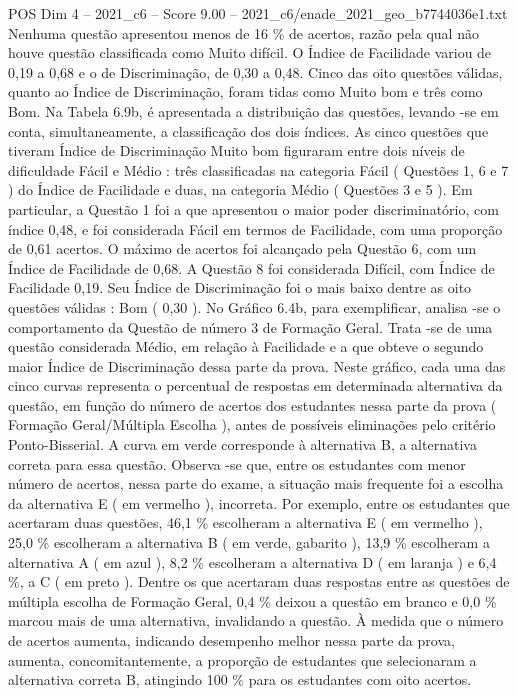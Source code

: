 \begin{textsample}{POS Dim 4 – 2021\_c6 – Score 9.00 – 2021\_c6/enade\_2021\_geo\_b7744036e1.txt}
Nenhuma questão apresentou menos de 16 \% de acertos, razão pela qual não houve questão classificada como Muito difícil.
O Índice de Facilidade variou de 0,19 a 0,68 e o de Discriminação, de 0,30 a 0,48.
Cinco das oito questões válidas, quanto ao Índice de Discriminação, foram tidas como Muito bom e três como Bom.
Na Tabela 6.9b, é apresentada a distribuição das questões, levando -se em conta, simultaneamente, a classificação dos dois índices.
As cinco questões que tiveram Índice de Discriminação Muito bom figuraram entre dois níveis de dificuldade Fácil e Médio : três classificadas na categoria Fácil ( Questões 1, 6 e 7 ) do Índice de Facilidade e duas, na categoria Médio ( Questões 3 e 5 ).
Em particular, a Questão 1 foi a que apresentou o maior poder discriminatório, com índice 0,48, e foi considerada Fácil em termos de Facilidade, com uma proporção de 0,61 acertos.
O máximo de acertos foi alcançado pela Questão 6, com um Índice de Facilidade de 0,68.
A Questão 8 foi considerada Difícil, com Índice de Facilidade 0,19.
Seu Índice de Discriminação foi o mais baixo dentre as oito questões válidas : Bom ( 0,30 ).
No Gráfico 6.4b, para exemplificar, analisa -se o comportamento da Questão de número 3 de Formação Geral.
Trata -se de uma questão considerada Médio, em relação à Facilidade e a que obteve o segundo maior Índice de Discriminação dessa parte da prova.
Neste gráfico, cada uma das cinco curvas representa o percentual de respostas em determinada alternativa da questão, em função do número de acertos dos estudantes nessa parte da prova ( Formação Geral/Múltipla Escolha ), antes de possíveis eliminações pelo critério Ponto-Bisserial.
A curva em verde corresponde à alternativa B, a alternativa correta para essa questão.
Observa -se que, entre os estudantes com menor número de acertos, nessa parte do exame, a situação mais frequente foi a escolha da alternativa E ( em vermelho ), incorreta.
Por exemplo, entre os estudantes que acertaram duas questões, 46,1 \% escolheram a alternativa E ( em vermelho ), 25,0 \% escolheram a alternativa B ( em verde, gabarito ), 13,9 \% escolheram a alternativa A ( em azul ), 8,2 \% escolheram a alternativa D ( em laranja ) e 6,4 \%, a C ( em preto ).
Dentre os que acertaram duas respostas entre as questões de múltipla escolha de Formação Geral, 0,4 \% deixou a questão em branco e 0,0 \% marcou mais de uma alternativa, invalidando a questão.
À medida que o número de acertos aumenta, indicando desempenho melhor nessa parte da prova, aumenta, concomitantemente, a proporção de estudantes que selecionaram a alternativa correta B, atingindo 100 \% para os estudantes com oito acertos.

\end{textsample}
